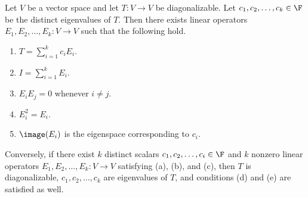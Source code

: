 \documentclass[linearalgebraII]{subfiles}
\begin{document}
    \clearpage
    \begin{theorem}{}
        Let $V$ be a vector space and let $T:V\to V$ be diagonalizable. Let $c_1,c_2,\ldots,c_k\in\F$ be the distinct eigenvalues of $T$. Then there exists linear operators $E_1,E_2,\ldots,E_k:V\to V$ such that the following hold.
        \begin{enumerate}
            \item $T = \sum^{k}_{i=1} c_iE_i$.
            \item $I = \sum^{k}_{i=1} E_i$.
            \item $E_iE_j = 0$ whenever $i\neq j$.
            \item $E_i^2 = E_i$.
            \item $\image(E_i)$ is the eigenspace corresponding to $c_i$.
        \end{enumerate}
        Conversely, if there exist $k$ distinct scalars $c_1, c_2, \ldots, c_i\in \F$ and $k$ nonzero linear operators $E_1, E_2, \ldots, E_k: V\to V$ satisfying (a), (b), and (c), then $T$ is diagonalizable, $c_1, c_2, \ldots, c_k$ are eigenvalues of $T$, and conditions (d) and (e) are satisfied as well.
    \end{theorem}
\end{document}
